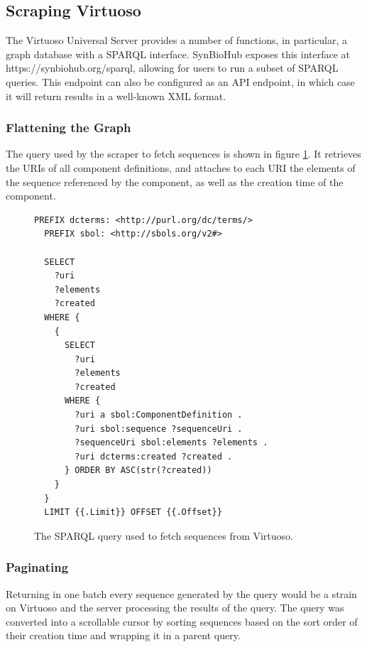 \documentclass[journal,comsoc]{IEEEtran}
\begin{document}
\subsection{Scraping Virtuoso}

The Virtuoso Universal Server provides a number of functions, in particular,
a graph database with a SPARQL interface. SynBioHub exposes this interface 
at https://synbiohub.org/sparql, allowing for users to run a subset 
of SPARQL queries. This endpoint can also be configured as an API endpoint,
in which case it will return results in a well-known XML format. 

\subsubsection{Flattening the Graph}

The query used by the scraper to fetch sequences is shown in figure \ref{sparqlquery}.
It retrieves the URIs of all component definitions, and attaches to each URI the elements
of the sequence referenced by the component, as well as the creation time of the component.

\begin{figure}[!t]
\centering
\begin{lstlisting}[language=sparql]
  PREFIX dcterms: <http://purl.org/dc/terms/>
  PREFIX sbol: <http://sbols.org/v2#>
  
  SELECT
    ?uri
    ?elements
    ?created
  WHERE {
    {
      SELECT
        ?uri
        ?elements
        ?created
      WHERE {
        ?uri a sbol:ComponentDefinition .
        ?uri sbol:sequence ?sequenceUri .
        ?sequenceUri sbol:elements ?elements .
        ?uri dcterms:created ?created .
      } ORDER BY ASC(str(?created))
    }
  }
  LIMIT {{.Limit}} OFFSET {{.Offset}}
\end{lstlisting}
\caption{The SPARQL query used to fetch sequences from Virtuoso.}
\label{sparqlquery}
\end{figure}

\subsubsection{Paginating}

Returning in one batch every sequence generated by the query would be
a strain on Virtuoso and the server processing the results of the query.
The query was converted into a scrollable cursor by sorting sequences based 
on the sort order of their creation time and wrapping it in a parent
query. 
\end{document}
